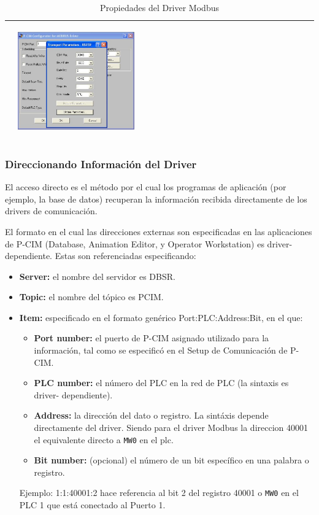 \begin{table}[H]
\begin{tabular}{*{2}{m{}}}
  &\begin{center}
        \includegraphics[width=0.4\textwidth]
      {Cap5-SCADA/images/modbusDriver2.jpeg}
  \end{center}\\
\hline
\end{tabular}
\caption{Propiedades del Driver Modbus}
\label{tab:PropModbus}
\end{table}

\subsubsection{Direccionando Información del Driver}
\label{subsubsec:InforDriver}
El acceso directo es el método por el cual los programas de aplicación (por
ejemplo, la base de datos) recuperan la información recibida directamente de 
los drivers de comunicación.

El formato en el cual las direcciones externas son especificadas en las
aplicaciones de P-CIM (Database, Animation Editor, y Operator
Workstation) es driver-dependiente. Estas son referenciadas especificando:
\begin{itemize}
 \item \textbf{Server:} el nombre del servidor es DBSR.
 \item \textbf{Topic:} el nombre del tópico es PCIM.
 \item \textbf{Item:} especificado en el formato genérico Port:PLC:Address:Bit,
en
  el que:
  \begin{itemize}
   \item \textbf{Port number:} el puerto de P-CIM asignado utilizado para la
    información, 
    tal como se especificó en el Setup de Comunicación de P-CIM.
   \item \textbf{PLC number:} el número del PLC en la red de PLC (la sintaxis
es driver-
    dependiente).
    \item \textbf{Address:} la dirección del dato o registro. La sintáxis
depende 
    directamente del driver. Siendo para el driver Modbus la direccion 40001 el 
    equivalente directo a \verb|MW0| en el \gls{plc}.
    \item \textbf{Bit number:} (opcional) el número de un bit específico en una
palabra o registro.
  \end{itemize}
  Ejemplo: 1:1:40001:2 hace referencia al bit 2 del registro 40001 o \verb|MW0|
en el PLC 1 que está conectado al Puerto 1.
\end{itemize}

